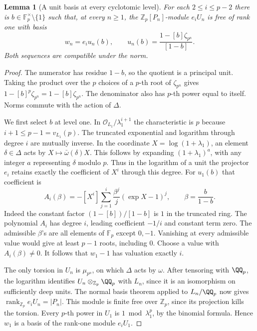 \documentclass[a4paper,11pt]{article}
\newtheorem{lemma}[proposition]{Lemma}
\theoremstyle{definition}
\theoremstyle{remark}
\newcommand{\ZZ}{\mathbb Z}\newcommand{\ord}{\operatorname{ord}}
\numberwithin{equation}{section}
\begin{document}
\begin{lemma}[A unit basis at every cyclotomic level]
\leavevmode\label{lem:unitbasis751}
For each \(2\le i\le p-2\) there is
\(b\in\mathbb F_p^\times\setminus\{1\}\) such that, at every
\(n\ge1\), the \(\ZZ_p[P_n]\)-module \(e_i U_n\) is free of rank
one with basis
\[
 w_n=e_i u_n(b),\qquad
 u_n(b)=\frac{1-[b]\zeta_{p^n}}{[1-b]}.
\]
Both sequences are compatible under the norm.
\end{lemma}
\begin{proof}
The numerator has residue \(1-b\), so the quotient is a principal
unit. Taking the product over the \(p\) choices of a \(p\)-th root
of \(\zeta_{p^n}\) gives \(1-[b]^p\zeta_{p^n}=1-[b]\zeta_{p^n}\).
The denominator also has \(p\)-th power equal to itself. Norms
commute with the action of \(\Delta\).

We first select \(b\) at level one. In
\(\mathcal O_{L_1}/\lambda_1^{i+1}\) the characteristic is \(p\)
because \(i+1\le p-1=v_{L_1}(p)\). The truncated exponential
and logarithm through degree \(i\) are mutually inverse.
In the coordinate \(X=\log(1+\lambda_1)\), an element
\(\delta\in\Delta\) acts by \(X\mapsto\bar\omega(\delta)X\).
This follows by expanding \((1+\lambda_1)^a\), with any integer
\(a\) representing \(\delta\) modulo \(p\). Thus in the logarithm
of a unit the projector \(e_i\) retains exactly the coefficient
of \(X^i\) through this degree. For \(u_1(b)\) that coefficient is
\[
 A_i(\beta)=-[X^i]\sum_{j=1}^{i}
               \frac{\beta^j}{j}(\exp X-1)^j,\qquad
 \beta=\frac{b}{1-b}.
\]
Indeed the constant factor \((1-[b])/[1-b]\) is \(1\) in the
truncated ring. The polynomial \(A_i\) has degree \(i\), leading
coefficient \(-1/i\) and constant term zero. The admissible
\(\beta\)'s are all elements of \(\mathbb F_p\) except \(0,-1\).
Vanishing at every admissible value would give at least \(p-1\)
roots, including \(0\). Choose a value with \(A_i(\beta)\ne0\).
It follows that \(w_1-1\) has valuation exactly \(i\).

The only torsion in \(U_n\) is \(\mu_{p^n}\), on which \(\Delta\)
acts by \(\omega\). After tensoring with \(\QQ_p\), the logarithm
identifies \(U_n\otimes_{\ZZ_p}\QQ_p\) with \(L_n\), since it
is an isomorphism on sufficiently deep units. The normal basis
theorem applied to \(L_n/\QQ_p\) now gives
\(\operatorname{rank}_{\ZZ_p} e_i U_n=|P_n|\).
This module is finite free over \(\ZZ_p\), since its projection
kills the torsion. Every \(p\)-th power in \(U_1\) is
\(1\bmod\lambda_1^p\), by the binomial formula. Hence \(w_1\)
is a basis of the rank-one module \(e_i U_1\).


\end{proof}
\end{document}
